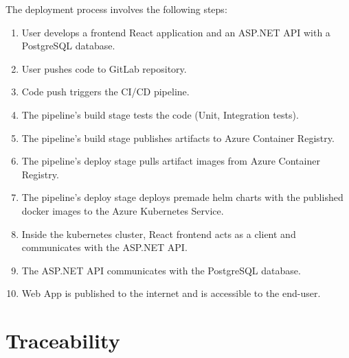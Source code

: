 \documentclass[
    english, %
]{VUMIFPSkursinis}
\begin{document}
The deployment process involves the following steps:

\begin{enumerate}
    \item User develops a frontend React application and an ASP.NET API with a PostgreSQL database.
    \item User pushes code to GitLab repository.
    \item Code push triggers the CI/CD pipeline.
    \item The pipeline's build stage tests the code (Unit, Integration tests).
    \item The pipeline's build stage publishes artifacts to Azure Container Registry.
    \item The pipeline's deploy stage pulls artifact images from Azure Container Registry.
    \item The pipeline's deploy stage deploys premade helm charts with the published docker images to the Azure Kubernetes Service.
    \item Inside the kubernetes cluster, React frontend acts as a client and communicates with the ASP.NET API.
    \item The ASP.NET API communicates with the PostgreSQL database.
    \item Web App is published to the internet and is accessible to the end-user.
\end{enumerate}

\section{Traceability}

\listoffigures
\printbibliography[heading=bibintoc]
\end{document}
